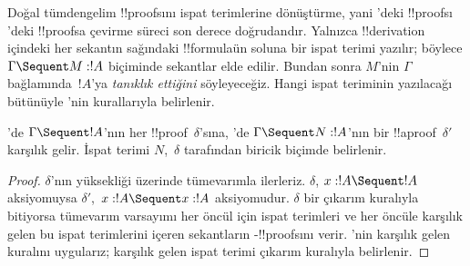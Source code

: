 \documentclass[../../../include/open-logic-section]{subfiles}
\begin{document}


Doğal tümdengelim !!{proof}s{}ını ispat terimlerine dönüştürme, yani
'deki !!{proof}s{}ı 'deki !!{proof}s{}a çevirme süreci son
derece doğrudandır. Yalnızca !!{derivation} içindeki her sekantın sağındaki
!!{formula}{}ün soluna bir ispat terimi yazılır; böylece $\Gamma \Sequent M
: !A$ biçiminde sekantlar elde edilir. Bundan sonra $M$'nin $\Gamma$
bağlamında~$!A$'ya \emph{tanıklık ettiğini} söyleyeceğiz. Hangi ispat
teriminin yazılacağı bütünüyle 'nin kurallarıyla belirlenir.

\begin{prop}
'de $\Gamma \Sequent !A$'nın her !!{proof}~$\delta$'sına,
'de $\Gamma \Sequent N : !A$'nın bir !!a{proof}~$\delta'$ karşılık
gelir. İspat terimi $N$,~$\delta$ tarafından biricik biçimde belirlenir.
\end{prop}

\begin{proof}
$\delta$'nın yüksekliği üzerinde tümevarımla ilerleriz. $\delta$, $x:!A
\Sequent !A$ aksiyomuysa $\delta'$,~$x:!A \Sequent x:!A$ aksiyomudur.
$\delta$ bir çıkarım kuralıyla bitiyorsa tümevarım varsayımı her öncül için
ispat terimleri ve her öncüle karşılık gelen bu ispat terimlerini içeren
sekantların -!!{proof}s{}ını verir. 'nin karşılık gelen
kuralını uygularız; karşılık gelen ispat terimi  çıkarım kuralıyla
belirlenir.
\end{proof}
\end{document}
